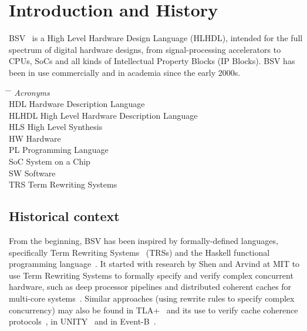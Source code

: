 \documentclass[11pt]{article}
\newcommand{\hmm}{\hspace*{2em}}
\begin{document}

\section{Introduction and History}

BSV~\cite{Bluespec2015} is a High Level Hardware Design Language
(HLHDL), intended for the full spectrum of digital hardware designs,
from signal-processing accelerators to CPUs, SoCs and all kinds of
Intellectual Property Blocks (IP Blocks).  BSV has been in use
commercially and in academia since the early 2000s.

\begin{tabbing}
\hmm \= \hspace*{1.5in} \= \kill
     \> \emph{Acronyms} \\
     \> HDL   \> Hardware Description Language \\
     \> HLHDL \> High Level Hardware Description Language \\
     \> HLS   \> High Level Synthesis \\
     \> HW    \> Hardware \\
     \> PL    \> Programming Language \\
     \> SoC   \> System on a Chip \\
     \> SW    \> Software \\
     \> TRS   \> Term Rewriting Systems
\end{tabbing}


\subsection{Historical context}

From the beginning, BSV has been inspired by formally-defined
languages, specifically Term Rewriting Systems~\cite{Klop1992a,
Terese2003, Baader98a} (TRSs) and the Haskell functional programming
language~\cite{PeytonJones2003a}.  It started with research by Shen
and Arvind at MIT to use Term Rewriting Systems to formally specify
and verify complex concurrent hardware, such as deep processor
pipelines and distributed coherent caches for multi-core
systems~\cite{Arvind1998a,StoyFME2001}.  Similar approaches (using
rewrite rules to specify complex concurrency) may also be found in
TLA+~\cite{Lamport2002a} and its use to verify cache coherence
protocols~\cite{Akhiani1999a,Joshi2003a}, in UNITY~\cite{Chandy1988a}
and in Event-B~\cite{Metayer2005a}.
\end{document}
